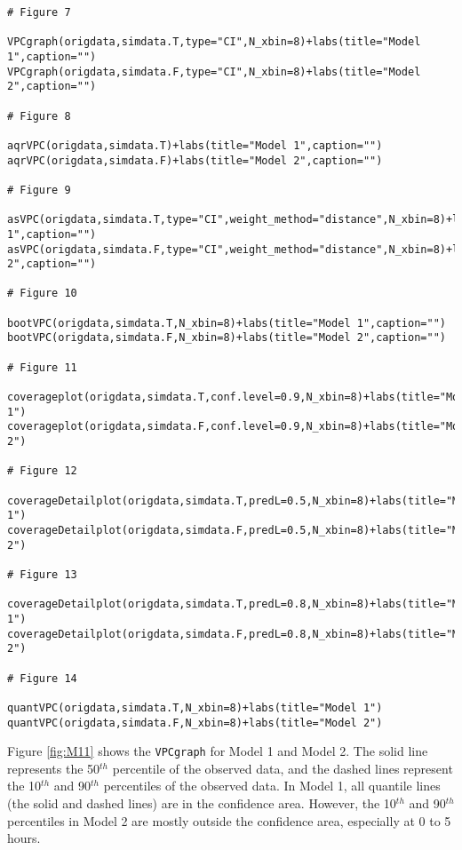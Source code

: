 \begin{verbatim}
# Figure 7
 
VPCgraph(origdata,simdata.T,type="CI",N_xbin=8)+labs(title="Model 1",caption="")
VPCgraph(origdata,simdata.F,type="CI",N_xbin=8)+labs(title="Model 2",caption="")
  
# Figure 8
 
aqrVPC(origdata,simdata.T)+labs(title="Model 1",caption="")
aqrVPC(origdata,simdata.F)+labs(title="Model 2",caption="")
  
# Figure 9
 
asVPC(origdata,simdata.T,type="CI",weight_method="distance",N_xbin=8)+labs(title="Model 1",caption="")
asVPC(origdata,simdata.F,type="CI",weight_method="distance",N_xbin=8)+labs(title="Model 2",caption="")

# Figure 10
 
bootVPC(origdata,simdata.T,N_xbin=8)+labs(title="Model 1",caption="")
bootVPC(origdata,simdata.F,N_xbin=8)+labs(title="Model 2",caption="")
  
# Figure 11
 
coverageplot(origdata,simdata.T,conf.level=0.9,N_xbin=8)+labs(title="Model 1")
coverageplot(origdata,simdata.F,conf.level=0.9,N_xbin=8)+labs(title="Model 2")
  
# Figure 12
 
coverageDetailplot(origdata,simdata.T,predL=0.5,N_xbin=8)+labs(title="Model 1")
coverageDetailplot(origdata,simdata.F,predL=0.5,N_xbin=8)+labs(title="Model 2")
  
# Figure 13
 
coverageDetailplot(origdata,simdata.T,predL=0.8,N_xbin=8)+labs(title="Model 1")
coverageDetailplot(origdata,simdata.F,predL=0.8,N_xbin=8)+labs(title="Model 2")
  
# Figure 14
 
quantVPC(origdata,simdata.T,N_xbin=8)+labs(title="Model 1")
quantVPC(origdata,simdata.F,N_xbin=8)+labs(title="Model 2")
\end{verbatim}

Figure \ref{fig:M11} shows the \texttt{VPCgraph} for Model 1 and Model 2.
The solid line represents the 50\(^{th}\) percentile of the observed data, and the dashed lines represent the 10\(^{th}\) and 90\(^{th}\) percentiles of the observed data. In Model 1, all quantile lines (the solid and dashed lines) are in the confidence area. However, the 10\(^{th}\) and 90\(^{th}\) percentiles in Model 2 are mostly outside the confidence area, especially at 0 to 5 hours.


